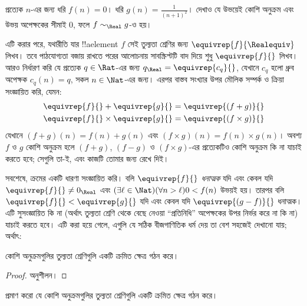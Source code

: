 \documentclass[../../../include/open-logic-section]{subfiles}
\begin{document}
\begin{prob}
প্রত্যেক $n$-এর জন্য ধরি $f(n) = 0$। ধরি $g(n) = \frac{1}{(n+1)^2}$। দেখাও যে উভয়েই কোশি অনুক্রম এবং উভয় অপেক্ষকের সীমাই $0$, ফলে $f \sim_\Real g$-ও হয়।
\end{prob}

এটি করার পরে, যথারীতি যার !!a{element} $f$ সেই তুল্যতা শ্রেণির জন্য $\equivrep{f}{\Realequiv}$ লিখব। তবে পাঠযোগ্যতা বজায় রাখতে পরের আলোচনায় সাবস্ক্রিপ্টটি বাদ দিয়ে শুধু $\equivrep{f}{}$ লিখব। আরও নির্ধারণ করি যে প্রত্যেক $q \in \Rat$-এর জন্য $q_{\Real} = \equivrep{c_{q}}{}$, যেখানে $c_{q}$ হলো ধ্রুব অপেক্ষক $c_q(n) = q$, সকল $n \in \Nat$-এর জন্য। এরপর বাস্তব সংখ্যার উপর মৌলিক সম্পর্ক ও ক্রিয়া সংজ্ঞায়িত করি, যেমন:
\begin{align*}
	\equivrep{f}{} + \equivrep{g}{} &= 	\equivrep{(f + g)}{} \\
	\equivrep{f}{} \times 	\equivrep{g}{} &= \equivrep{(f \times g)}{}
\end{align*}
যেখানে $(f + g)(n) = f(n) + g(n)$ এবং $(f \times g)(n) = f(n) \times
g(n)$। অবশ্য $f$ ও $g$ কোশি অনুক্রম হলে $(f + g)$,
$(f-g)$ ও $(f\times g)$-এর প্রত্যেকটিও কোশি অনুক্রম কি না যাচাই করতে হবে; সেগুলি তা-ই, এবং কাজটি তোমার জন্য রেখে দিই।

সবশেষে, ক্রমের একটি ধারণা সংজ্ঞায়িত করি। বলি $\equivrep{f}{}$
\emph{ধনাত্মক} যদি এবং কেবল যদি $\equivrep{f}{}\neq 0_\Real$ এবং $(\exists
\ell \in \Nat)(\forall n > \ell)0 < f(n)$ উভয়ই হয়। 
তারপর বলি $\equivrep{f}{} <
\equivrep{g}{}$ যদি এবং কেবল যদি $\equivrep{(g - f)}{}$ ধনাত্মক। এটি সুসংজ্ঞায়িত কি না (অর্থাৎ তুল্যতা শ্রেণি থেকে বেছে নেওয়া ``প্রতিনিধি'' অপেক্ষকের উপর নির্ভর করে না কি না) যাচাই করতে হবে।
এটি করা হয়ে গেলে, এগুলি যে সঠিক বীজগাণিতিক ধর্ম দেয় তা বেশ সহজেই দেখানো যায়; অর্থাৎ:
\begin{thm}
কোশি অনুক্রমগুলির তুল্যতা শ্রেণিগুলি একটি ক্রমিত ক্ষেত্র গঠন করে। 
\end{thm}

\begin{proof}
অনুশীলন।
\end{proof}

\begin{prob}
প্রমাণ করো যে কোশি অনুক্রমগুলির তুল্যতা শ্রেণিগুলি একটি ক্রমিত ক্ষেত্র গঠন করে।
\end{prob}
\end{document}
